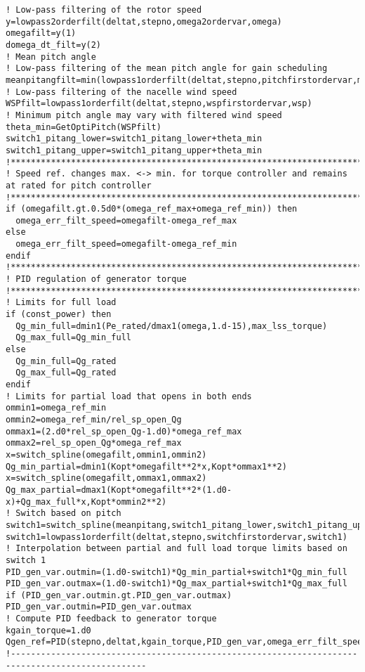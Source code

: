 {\begin{verbatim}
! Low-pass filtering of the rotor speed
y=lowpass2orderfilt(deltat,stepno,omega2ordervar,omega)
omegafilt=y(1)
domega_dt_filt=y(2)
! Mean pitch angle
! Low-pass filtering of the mean pitch angle for gain scheduling
meanpitangfilt=min(lowpass1orderfilt(deltat,stepno,pitchfirstordervar,meanpitang),30.d0*degrad)
! Low-pass filtering of the nacelle wind speed
WSPfilt=lowpass1orderfilt(deltat,stepno,wspfirstordervar,wsp)
! Minimum pitch angle may vary with filtered wind speed
theta_min=GetOptiPitch(WSPfilt)
switch1_pitang_lower=switch1_pitang_lower+theta_min
switch1_pitang_upper=switch1_pitang_upper+theta_min
!**************************************************************************************************
! Speed ref. changes max. <-> min. for torque controller and remains at rated for pitch controller
!**************************************************************************************************
if (omegafilt.gt.0.5d0*(omega_ref_max+omega_ref_min)) then
  omega_err_filt_speed=omegafilt-omega_ref_max
else
  omega_err_filt_speed=omegafilt-omega_ref_min
endif
!**************************************************************************************************
! PID regulation of generator torque
!**************************************************************************************************
! Limits for full load
if (const_power) then
  Qg_min_full=dmin1(Pe_rated/dmax1(omega,1.d-15),max_lss_torque)
  Qg_max_full=Qg_min_full
else
  Qg_min_full=Qg_rated
  Qg_max_full=Qg_rated
endif
! Limits for partial load that opens in both ends
ommin1=omega_ref_min
ommin2=omega_ref_min/rel_sp_open_Qg
ommax1=(2.d0*rel_sp_open_Qg-1.d0)*omega_ref_max
ommax2=rel_sp_open_Qg*omega_ref_max
x=switch_spline(omegafilt,ommin1,ommin2)
Qg_min_partial=dmin1(Kopt*omegafilt**2*x,Kopt*ommax1**2)
x=switch_spline(omegafilt,ommax1,ommax2)
Qg_max_partial=dmax1(Kopt*omegafilt**2*(1.d0-x)+Qg_max_full*x,Kopt*ommin2**2)
! Switch based on pitch
switch1=switch_spline(meanpitang,switch1_pitang_lower,switch1_pitang_upper)
switch1=lowpass1orderfilt(deltat,stepno,switchfirstordervar,switch1)
! Interpolation between partial and full load torque limits based on switch 1
PID_gen_var.outmin=(1.d0-switch1)*Qg_min_partial+switch1*Qg_min_full
PID_gen_var.outmax=(1.d0-switch1)*Qg_max_partial+switch1*Qg_max_full
if (PID_gen_var.outmin.gt.PID_gen_var.outmax) PID_gen_var.outmin=PID_gen_var.outmax
! Compute PID feedback to generator torque
kgain_torque=1.d0
Qgen_ref=PID(stepno,deltat,kgain_torque,PID_gen_var,omega_err_filt_speed)
!-------------------------------------------------------------------------------------------------

\end{verbatim}}
